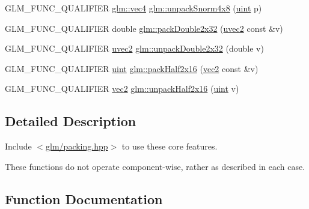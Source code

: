 \begin{DoxyCompactItemize}
\item 
G\+L\+M\+\_\+\+F\+U\+N\+C\+\_\+\+Q\+U\+A\+L\+I\+F\+I\+ER \hyperlink{group__core__types_ga5881b1b022d7fd1b7218f5916532dd02}{glm\+::vec4} \hyperlink{group__core__func__packing_ga2db488646d48b7c43d3218954523fe82}{glm\+::unpack\+Snorm4x8} (\hyperlink{group__core__precision_ga4fd29415871152bfb5abd588334147c8}{uint} p)
\item 
G\+L\+M\+\_\+\+F\+U\+N\+C\+\_\+\+Q\+U\+A\+L\+I\+F\+I\+ER double \hyperlink{group__core__func__packing_gaa916ca426b2bb0343ba17e3753e245c2}{glm\+::pack\+Double2x32} (\hyperlink{group__core__types_gafd2041b45eff671aa8899d2c2835eee9}{uvec2} const \&v)
\item 
G\+L\+M\+\_\+\+F\+U\+N\+C\+\_\+\+Q\+U\+A\+L\+I\+F\+I\+ER \hyperlink{group__core__types_gafd2041b45eff671aa8899d2c2835eee9}{uvec2} \hyperlink{group__core__func__packing_ga5f4296dc5f12f0aa67ac05b8bb322483}{glm\+::unpack\+Double2x32} (double v)
\item 
G\+L\+M\+\_\+\+F\+U\+N\+C\+\_\+\+Q\+U\+A\+L\+I\+F\+I\+ER \hyperlink{group__core__precision_ga4fd29415871152bfb5abd588334147c8}{uint} \hyperlink{group__core__func__packing_ga20f134b07db3a3d3a38efb2617388c92}{glm\+::pack\+Half2x16} (\hyperlink{group__core__types_gaa1618f51db67eaa145db101d8c8431d8}{vec2} const \&v)
\item 
G\+L\+M\+\_\+\+F\+U\+N\+C\+\_\+\+Q\+U\+A\+L\+I\+F\+I\+ER \hyperlink{group__core__types_gaa1618f51db67eaa145db101d8c8431d8}{vec2} \hyperlink{group__core__func__packing_gaf59b52e6b28da9335322c4ae19b5d745}{glm\+::unpack\+Half2x16} (\hyperlink{group__core__precision_ga4fd29415871152bfb5abd588334147c8}{uint} v)
\end{DoxyCompactItemize}


\subsection{Detailed Description}
Include $<$\hyperlink{packing_8hpp}{glm/packing.\+hpp}$>$ to use these core features.

These functions do not operate component-\/wise, rather as described in each case. 

\subsection{Function Documentation}
\mbox{\label{group__core__func__packing_gaa916ca426b2bb0343ba17e3753e245c2}} 
